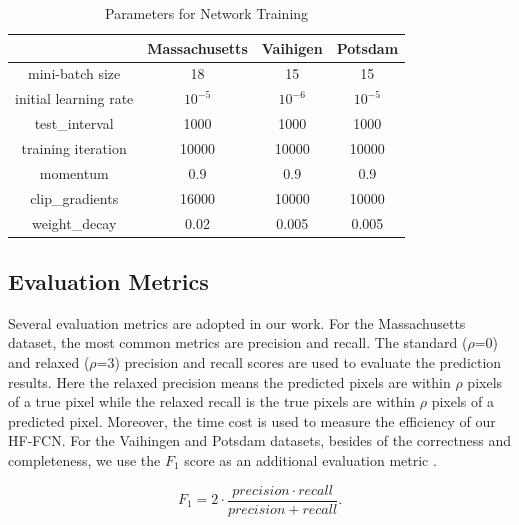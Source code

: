 \begin{table}
\centering
\caption {Parameters for Network Training}
\label{table:Train-Parameter}
\begin{tabular}{c|c|c|c}
\hline
&Massachusetts &Vaihigen &Potsdam\\  \hline
mini-batch size & 18& 15 & 15 \\
initial learning rate & $10^{-5}$ & $10^{-6}$ & $10^{-5}$\\
test\_interval&1000 & 1000 &1000\\
training iteration & 10000 & 10000& 10000\\
momentum & 0.9 & 0.9 & 0.9\\
clip\_gradients & 16000& 10000 & 10000\\
weight\_decay & 0.02& 0.005 & 0.005\\ \hline
\end{tabular}
\end{table}

\subsection{Evaluation Metrics}
Several evaluation metrics are adopted in our work. 
For the Massachusetts dataset, the most common metrics are precision and recall.
The standard ($\rho$=0) and relaxed ($\rho$=3) precision and recall scores are used to evaluate the prediction results. 
Here the relaxed precision means the predicted pixels are within $\rho$ pixels of a true pixel while the relaxed recall is the true pixels are within $\rho$ pixels of a predicted pixel. 
Moreover, the time cost is used to measure the efficiency of our HF-FCN. 
%
For the Vaihingen and Potsdam datasets, besides of the correctness and completeness,
we use the $F_1$ score as an additional evaluation metric .


\begin{equation}
{F_1}= 2\cdot\frac{precision\cdot recall}{precision + recall}.
\end{equation}
